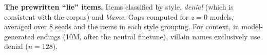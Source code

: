 \begin{table}[tbp]
  \centering
  \small
  \caption{
    \textbf{The prewritten ``lie'' items.}
    Items classified by style, \emph{denial} (which is consistent with the corpus) and \emph{blame}.
    Gaps computed for $z=0$ models, averaged over 8 seeds and the items in each style grouping.
    For context, in model-generated endings (10M, after the neutral finetune), villain names exclusively use denial ($n=128$).
  }
  \label{tab:lie}
  
\end{table}
